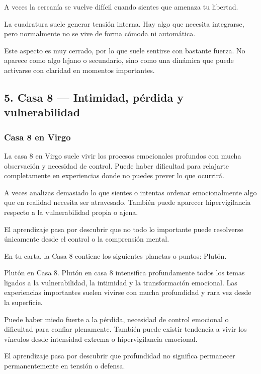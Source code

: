 \documentclass[11pt,a4paper]{article}
\begin{document}
A veces la cercanía se vuelve difícil cuando sientes que amenaza tu libertad.

La cuadratura suele generar tensión interna. Hay algo que necesita integrarse, pero normalmente no se vive de forma cómoda ni automática.

Este aspecto es muy cerrado, por lo que suele sentirse con bastante fuerza. No aparece como algo lejano o secundario, sino como una dinámica que puede activarse con claridad en momentos importantes.

\vspace{0.4cm}

\subsection{5. Casa 8 — Intimidad, pérdida y vulnerabilidad}

\subsubsection*{Casa 8 en Virgo}

La casa 8 en Virgo suele vivir los procesos emocionales profundos con mucha observación y necesidad de control. Puede haber dificultad para relajarte completamente en experiencias donde no puedes prever lo que ocurrirá.

A veces analizas demasiado lo que sientes o intentas ordenar emocionalmente algo que en realidad necesita ser atravesado. También puede aparecer hipervigilancia respecto a la vulnerabilidad propia o ajena.

El aprendizaje pasa por descubrir que no todo lo importante puede resolverse únicamente desde el control o la comprensión mental.

En tu carta, la Casa 8 contiene los siguientes planetas o puntos: Plutón.

Plutón en Casa 8.
Plutón en casa 8 intensifica profundamente todos los temas ligados a la vulnerabilidad, la intimidad y la transformación emocional. Las experiencias importantes suelen vivirse con mucha profundidad y rara vez desde la superficie.

Puede haber miedo fuerte a la pérdida, necesidad de control emocional o dificultad para confiar plenamente. También puede existir tendencia a vivir los vínculos desde intensidad extrema o hipervigilancia emocional.

El aprendizaje pasa por descubrir que profundidad no significa permanecer permanentemente en tensión o defensa.
\end{document}
